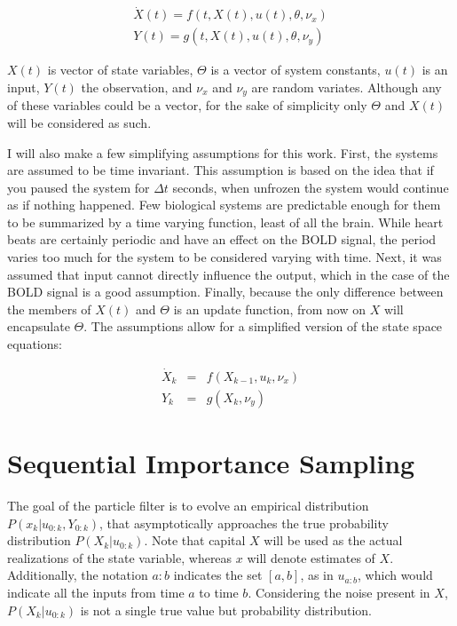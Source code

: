 \begin{eqnarray}
\dot{X}(t) = f(t, X(t), u(t), \theta, \nu_x) \nonumber \\
Y(t) = g(t, X(t), u(t), \theta, \nu_y)
\label{eq:GenericNonlinear}
\end{eqnarray}

$X(t)$ is vector of state variables, $\Theta$ is a vector of system
constants, $u(t)$ is an input, $Y(t)$ the observation, and
$\nu_x$ and $\nu_y$ are random variates. Although any of these
variables could be a vector, for the sake of simplicity only
$\Theta$ and $X(t)$ will be considered as such. 

I will also make a few  simplifying assumptions for this work. 
First, the systems are assumed to be 
time invariant. This 
assumption is based on the idea that if you paused the system for $\Delta t$
seconds, when unfrozen the system would continue as if nothing happened. 
Few biological systems are predictable enough for them to be summarized
by a time varying function, least of all the brain. While heart beats are certainly
periodic and have an effect on the \ac{BOLD} signal, the period varies too much
for the system to be considered varying with time. 
Next, it was assumed that input cannot directly
influence the output, which in the case of the \ac{BOLD} signal is a good assumption.
Finally, because the only difference between the members of $X(t)$ and 
$\Theta$ is an update function, from now on $X$ will encapsulate
$\Theta$. The assumptions allow for a simplified version of the
state space equations:

\begin{eqnarray}
\dot{X}_k &=& f(X_{k-1}, u_k, \nu_x)
\label{eq:stateass}\\
Y_k &= &g(X_k, \nu_y)
\label{eq:measass}
\end{eqnarray}

\section{Sequential Importance Sampling}
The goal of the particle filter is to evolve an empirical distribution 
$P(x_k | u_{0:k}, Y_{0:k})$,
that asymptotically approaches the true probability distribution $P(X_k | u_{0:k})$.
Note that capital $X$ will be used as the actual realizations of 
the state variable, whereas $x$ will denote estimates of $X$.
Additionally, the notation $a:b$ indicates the set $[a,b]$,
as in $u_{a:b}$, which would indicate all the inputs from time $a$ to time $b$.
Considering the noise present in $X$,
 $P(X_k | u_{0:k})$ is not a single true value but probability distribution. 


